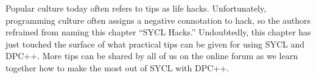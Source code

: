

Popular culture today often refers to tips as life hacks. Unfortunately, programming culture often assigns a negative connotation to hack, so the authors refrained from naming this chapter “SYCL Hacks.” Undoubtedly, this chapter has just touched the surface of what practical tips can be given for using SYCL and DPC++. More tips can be shared by all of us on the online forum as we learn together how to make the most out of SYCL with DPC++.\par











\newpage